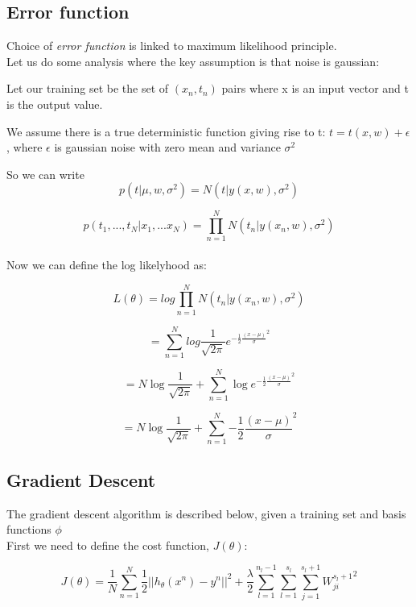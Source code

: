 \documentclass[a4paper]{article}
\begin{document}
	\subsection{Error function}
	Choice of \textit{error function} is linked to maximum likelihood principle. \\
	
	Let us do some analysis where the key assumption is that noise is gaussian:
	
	Let our training set be the set of ${(x_n, t_n)}$ pairs where x is an input
	vector and t is the output value.
	
	We assume there is a true deterministic function giving rise to t:
	$t = t(x, w) + \epsilon$, where $\epsilon$ is gaussian noise with zero mean and
	variance $\sigma^2$
    
    So we can write \\
    
    $$p(t|\mu, w, \sigma^2) = N(t|y(x, w), \sigma^2)$$    
    
    $$p(t_1,...,t_N|x_1,...x_N) = \prod_{n=1}^N N(t_n | y(x_n, w), \sigma^2)$$ \\
    
    Now we can define the log likelyhood as:
    
    $$L(\theta) = log \prod_{n=1}^N N(t_n | y(x_n, w), \sigma^2)$$
    
    $$ = \sum_{n=1}^N 
    log \frac{1}{\sqrt{2\pi}} e^{-\frac{1}{2}\frac{(x - \mu)}{\sigma}^2}$$
       
       
    $$ =  N \log \frac{1}{\sqrt{2\pi}} + \sum_{n=1}^N \log e^{-\frac{1}{2}\frac{(x - \mu)}{\sigma}^2}$$
    
    $$ =  N \log \frac{1}{\sqrt{2\pi}} + \sum_{n=1}^N {-\frac{1}{2}\frac{(x - \mu)}{\sigma}^2}$$
    
	\subsection{Gradient Descent}
	
	The gradient descent algorithm is described below, given a training set and basis functions $\phi$ \\
	
	First we need to define the cost function, $J(\theta)$:
	
	$$J(\theta) = \frac{1}{N} \sum_{n=1}^N \frac{1}{2} {||h_{\theta}(x^n) - y^n||}^2 + \frac{\lambda}{2}\sum_{l=1}^{n_l-1}\sum_{l=1}^{s_l}\sum_{j=1}^{s_l+1}{W_{ji}^{s_l+1}}^2$$
    
\end{document}
